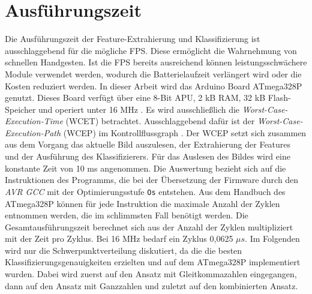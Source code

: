 \section{Ausführungszeit}
\label{sec:eval_speed}
Die Ausführungszeit der Feature-Extrahierung und Klassifizierung ist ausschlaggebend für die mögliche FPS. Diese ermöglicht die Wahrnehmung von schnellen Handgesten. Ist die FPS bereits ausreichend
können leistungsschwächere Module verwendet werden, wodurch die Batterielaufzeit verlängert wird oder die Kosten reduziert werden.
In dieser Arbeit wird das Arduino Board ATmega328P genutzt. Dieses Board verfügt über eine 8-Bit APU, 2 kB RAM, 32 kB Flash-Speicher und operiert unter 16 MHz \cite{atmega328p}.
\newline
\newline
Es wird ausschließlich die \textit{Worst-Case-Execution-Time} (WCET) betrachtet. Ausschlaggebend dafür ist der \textit{Worst-Case-Execution-Path} (WCEP) im Kontrollflussgraph \cite{wcc_intro}. Der WCEP
setzt sich zusammen aus dem Vorgang das aktuelle Bild auszulesen, der Extrahierung der Features und der Ausführung des Klassifizierers. Für das Auslesen des Bildes wird eine konstante Zeit von 10 ms angenommen.
\newline
\newline
Die Auswertung bezieht sich auf die Instruktionen des Programms, die bei der Übersetzung der Firmware durch den \textit{AVR GCC} mit der Optimierungsstufe \texttt{Os} entstehen. Aus dem Handbuch des
ATmega328P \cite{atmega328p} können für jede Instruktion die maximale Anzahl der Zyklen entnommen werden, die im schlimmsten Fall benötigt werden. Die Gesamtausführungszeit berechnet sich aus der Anzahl der Zyklen
multipliziert mit der Zeit pro Zyklus. Bei 16 MHz bedarf ein Zyklus 0,0625 $\mu s$.
\newline
\newline
Im Folgenden wird nur die Schwerpunktverteilung diskutiert, da die die besten Klassifizierungsgenauigkeiten erzielten und auf dem ATmega328P implementiert wurden. Dabei wird zuerst auf den Ansatz mit Gleitkommazahlen
eingegangen, dann auf den Ansatz mit Ganzzahlen und zuletzt auf den kombinierten Ansatz.





